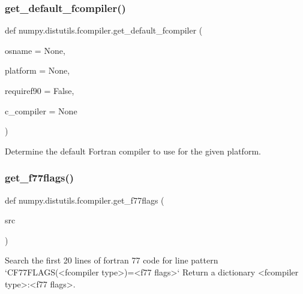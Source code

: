 \subsubsection{\texorpdfstring{get\+\_\+default\+\_\+fcompiler()}{get\_default\_fcompiler()}}
{\footnotesize\ttfamily def numpy.\+distutils.\+fcompiler.\+get\+\_\+default\+\_\+fcompiler (\begin{DoxyParamCaption}\item[{}]{osname = {\ttfamily None},  }\item[{}]{platform = {\ttfamily None},  }\item[{}]{requiref90 = {\ttfamily False},  }\item[{}]{c\+\_\+compiler = {\ttfamily None} }\end{DoxyParamCaption})}

\begin{DoxyVerb}Determine the default Fortran compiler to use for the given
platform.\end{DoxyVerb}
 \mbox{\label{namespacenumpy_1_1distutils_1_1fcompiler_a740db028b25a106e9171a210213e6558}} 
\subsubsection{\texorpdfstring{get\+\_\+f77flags()}{get\_f77flags()}}
{\footnotesize\ttfamily def numpy.\+distutils.\+fcompiler.\+get\+\_\+f77flags (\begin{DoxyParamCaption}\item[{}]{src }\end{DoxyParamCaption})}

\begin{DoxyVerb}Search the first 20 lines of fortran 77 code for line pattern
  `CF77FLAGS(<fcompiler type>)=<f77 flags>`
Return a dictionary {<fcompiler type>:<f77 flags>}.
\end{DoxyVerb}
 \mbox{\label{namespacenumpy_1_1distutils_1_1fcompiler_a957a24c960c8b0f6bb2c69332f1c2e8b}} 

